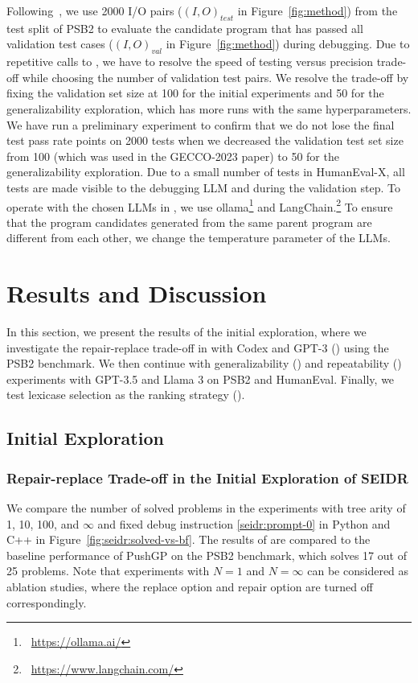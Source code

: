 Following~\citet{helmuth2021:psb2}, we use 2000 I/O pairs ($\left(I, O\right)_{test}$ in Figure~\ref{fig:method}) from the test split of PSB2 to evaluate the candidate program that has passed all validation test cases ($\left(I, O\right)_{val}$ in Figure~\ref{fig:method}) during debugging. 
Due to repetitive calls to \execute{}, we have to resolve the speed of testing versus precision trade-off while choosing the number of validation test pairs.
We resolve the trade-off by fixing the validation set size at 100 for the initial experiments and 50 for the generalizability exploration, which has more runs with the same hyperparameters. 
We have run a preliminary experiment to confirm that we do not lose the final test pass rate points on 2000 tests when we decreased the validation test set size from 100 (which was used in the GECCO-2023 paper) to 50 for the generalizability exploration.
Due to a small number of tests in HumanEval-X, all tests are made visible to the debugging LLM and during the validation step.  
To operate with the chosen LLMs in \method{}, we use ollama\footnote{~\url{https://ollama.ai/}} and LangChain.\footnote{~\url{https://www.langchain.com/}}  
To ensure that the program candidates generated from the same parent program are different from each other, we change the temperature parameter of the LLMs. 
 

\section{Results and Discussion}
\label{sec:results}

In this section, we present the results of the initial exploration, where we investigate the repair-replace trade-off in \method{} with Codex and GPT-3 (\rqtreearity{}) using the PSB2 benchmark.
We then continue with generalizability (\rqllama{}) and repeatability (\rqmultirun{}) experiments with GPT-3.5 and Llama 3 on PSB2 and HumanEval.
Finally, we test lexicase selection as the ranking strategy (\rqlexicase{}).

\subsection{Initial Exploration}

\subsubsection{Repair-replace Trade-off in the Initial Exploration of SEIDR}
\label{sec:seidr:rqtreearity}
We compare the number of solved problems in the experiments with tree arity of 1, 10, 100, and $\infty$ and fixed debug instruction \ref{seidr:prompt-0} in Python and C++ in Figure~\ref{fig:seidr:solved-vs-bf}. 
The results of \method{} are compared to the baseline performance of PushGP on the PSB2 benchmark, which solves 17 out of 25 problems. 
Note that experiments with $N=1$ and $N=\infty$ can be considered as ablation studies, where the replace option and repair option are turned off correspondingly. 

